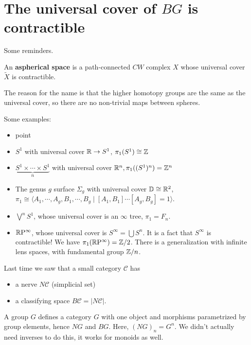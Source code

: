 \section{The universal cover of $BG$ is contractible} 
Some reminders.
\begin{definition}[]
    An \textbf{aspherical space} is a path-connected $CW$ complex $X$ whose universal cover $\widetilde X$ is contractible.
\end{definition}The reason for the name is that the higher homotopy groups are the same as the universal cover, so there are no non-trivial maps between spheres.
\begin{example}
    Some examples:
    \begin{itemize}
    \setlength\itemsep{-.2em}
        \item point
        \item $S^1 $ with universal cover $\mathbb{R} \to  S^1 $, $\pi_1(S^1 ) \cong \mathbb{Z}$ 
        \item $\underset{n}{\underbrace{S^1  \times  \cdots  \times S^1 } } $ with universal cover $\mathbb{R}^n  ,  \pi_1((S^1 )^n )=\mathbb{Z}^n $ 
        \item The genus $g$ surface $\Sigma_g$ with universal cover $\mathbb D \cong \mathbb{R}^2$, $\pi_1 \cong \langle A_1, \cdots ,A_g,B_1 ,\cdots ,B_g \mid [A_1,B_1]\cdots [A_g,B_g]=1 \rangle $.
        \item $\bigvee ^n  S^1 $, whose universal cover is an $\infty$ tree, $\pi_1=F_n $.
        \item $\mathbb{R} \mathrm P^{\infty} $, whose universal cover is $S^{\infty}=\bigcup S^n $. It is a fact that $S^{\infty}$ is contractible! We have $\pi_1(\mathbb{R} \mathrm P^{\infty})=\mathbb{Z} /2 $. There is a generalization with infinite lens spaces, with fundamental group $\mathbb{Z} /n$.
    \end{itemize}
\end{example}
Last time we saw that a small category $\mathcal{C} $ has
\begin{itemize}
\setlength\itemsep{-.2em}
    \item a nerve $N \mathcal{C} $ (simplicial set)
    \item a classifying space $B \mathcal{C} =|N \mathcal{C} |$.
\end{itemize}
\begin{example}
    A group $G$ defines a category $G$ with one object and morphisms parametrized by group elements, hence $NG$ and $BG$. Here, $(NG)_n =G^n $. We didn't actually need inverses to do this, it works for monoids as well.
\end{example}
